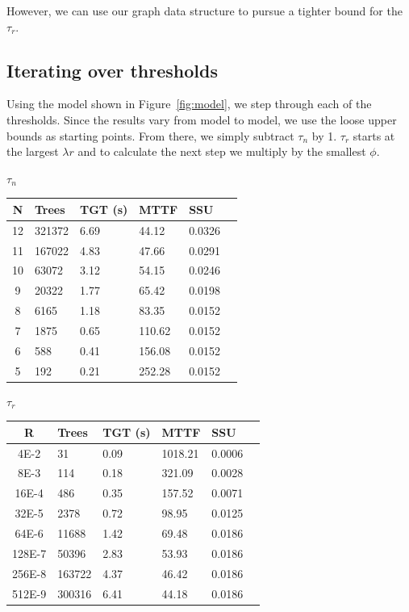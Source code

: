 \documentclass[12pt]{article}
\begin{document}
\vspace{1em}
However, we can use our graph data structure to pursue a tighter bound for the $\tau_r$.

\subsection{Iterating over thresholds}
Using the model shown in Figure~\ref{fig:model}, we step through each of the thresholds.
Since the results vary from model to model, we use the loose upper bounds as starting points.  From there, 
we simply subtract $\tau_n$ by 1.  $\tau_r$ starts at the largest $\lambda r$ and to calculate the next step we multiply by the smallest $\phi$.

$\tau_n$
\begin{center}
	\begin{tabular}{| c | lllll |}
    N  & Trees   & TGT (s) & MTTF   & SSU    \\ \hline
    12 & 321372  & 6.69    & 44.12  & 0.0326 \\ \hline
    11 & 167022  & 4.83    & 47.66  & 0.0291 \\ \hline
    10 & 63072   & 3.12    & 54.15  & 0.0246 \\ \hline
    9  & 20322   & 1.77    & 65.42  & 0.0198 \\ \hline
    8  & 6165    & 1.18    & 83.35  & 0.0152 \\ \hline
    7  & 1875    & 0.65    & 110.62 & 0.0152 \\ \hline
    6  & 588     & 0.41    & 156.08 & 0.0152 \\ \hline
    5  & 192     & 0.21    & 252.28 & 0.0152 \\ \hline
    \end{tabular}
\end{center}

$\tau_r$
\begin{center}
	\begin{tabular}{| c | lllll |}
    R      & Trees  & TGT (s) & MTTF    & SSU    \\ \hline
    4E-2   & 31     & 0.09    & 1018.21 & 0.0006 \\ \hline
    8E-3   & 114    & 0.18    & 321.09  & 0.0028 \\ \hline
    16E-4  & 486    & 0.35    & 157.52  & 0.0071 \\ \hline
    32E-5  & 2378   & 0.72    & 98.95   & 0.0125 \\ \hline
    64E-6  & 11688  & 1.42    & 69.48   & 0.0186 \\ \hline
    128E-7 & 50396  & 2.83    & 53.93   & 0.0186 \\ \hline
    256E-8 & 163722 & 4.37    & 46.42   & 0.0186 \\ \hline
    512E-9 & 300316 & 6.41    & 44.18   & 0.0186 \\ \hline
    \end{tabular}
\end{center}
\end{document}
